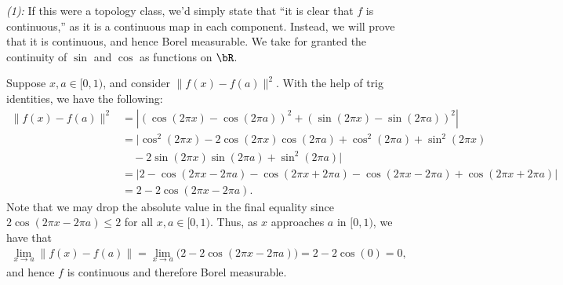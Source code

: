 \begin{homework}[e]
\begin{prf}
		\noindent \emph{(1):} \hspace{0.5em} If this were a topology class, we'd simply state that ``it is clear that $f$ is continuous,'' as it is a continuous map in each component. Instead, we will prove that it is continuous, and hence Borel measurable. We take for granted the continuity of $\sin$ and $\cos$ as functions on $\bR$.

		Suppose $x,a \in [0,1)$, and consider $\|f(x) - f(a)\|^2$. With the help of trig identities, we have the following:
		\begin{align*}
			\|f(x) - f(a)\|^2 &= |(\cos(2\pi x)-\cos(2\pi a))^2 + (\sin(2\pi x) - \sin(2\pi a))^2| \\
							  &= |\cos^2(2\pi x) - 2\cos(2\pi x)\cos(2\pi a) + \cos^2(2\pi a) + \sin^2(2\pi x) \\ &\hspace{1em}- 2\sin(2\pi x)\sin(2\pi a) + \sin^2(2\pi a)| \\
							  &= |2 - \cos(2\pi x - 2\pi a) - \cos(2\pi x + 2\pi a) - \cos(2\pi x - 2\pi a) + \cos(2\pi x + 2\pi a)| \\
							  &= 2 - 2\cos(2\pi x - 2\pi a).
		\end{align*}
		Note that we may drop the absolute value in the final equality since $2\cos(2\pi x - 2\pi a) \leq 2$ for all $x,a\in [0,1)$. Thus, as $x$ approaches $a$ in $[0,1)$, we have that
		\begin{align*}
			\lim_{x \to a}\|f(x) - f(a)\| = \lim_{x\to a} \big(2 - 2\cos(2\pi x - 2\pi a) \big)= 2- 2\cos(0) = 0,
		\end{align*}
		and hence $f$ is continuous and therefore Borel measurable.

		\bigskip


\end{prf}
\end{homework}
